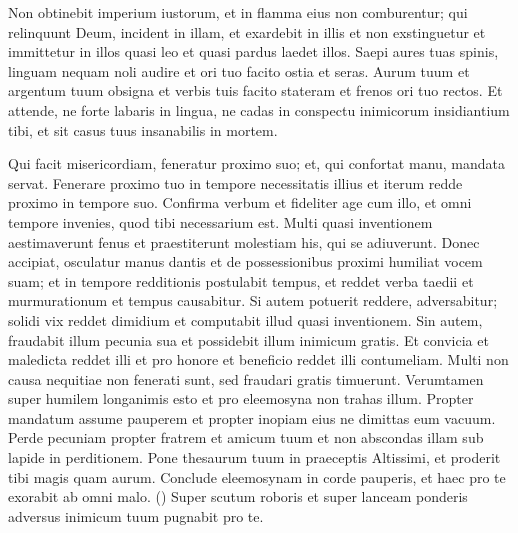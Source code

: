\begin{biblechapter}
\begin{biblechapter}
\begin{biblechapter}
\begin{biblechapter}
\begin{biblechapter}
\begin{biblechapter}
\begin{biblechapter}
\begin{biblechapter}
\begin{biblechapter}
\begin{biblechapter}
\begin{biblechapter}
\begin{biblechapter}
\begin{biblechapter}
\begin{biblechapter}
\begin{biblechapter}
\begin{biblechapter}
\begin{biblechapter}
\begin{biblechapter}
\begin{biblechapter}
\begin{biblechapter}
\begin{biblechapter}
\begin{biblechapter}
\begin{biblechapter}
\begin{biblechapter}
\begin{biblechapter}
\begin{biblechapter}
\begin{biblechapter}
\begin{biblechapter}
 \verse Non obtinebit imperium iustorum,
 et in flamma eius non comburentur;
 \verse qui relinquunt Deum, incident in illam,
 et exardebit in illis et non exstinguetur
 et immittetur in illos quasi leo
 et quasi pardus laedet illos.
 \verse Saepi aures tuas spinis, linguam nequam noli audire
 et ori tuo facito ostia et seras.
 \verse Aurum tuum et argentum tuum obsigna
 et verbis tuis facito stateram et frenos ori tuo rectos.
 \verse Et attende, ne forte labaris in lingua,
 ne cadas in conspectu inimicorum insidiantium tibi,
 et sit casus tuus insanabilis in mortem.
 
\begin{biblechapter}
 \verse Qui facit misericordiam, feneratur proximo suo;
 et, qui confortat manu, mandata servat.
 \verse Fenerare proximo tuo in tempore necessitatis illius
 et iterum redde proximo in tempore suo.
 \verse Confirma verbum et fideliter age cum illo,
 et omni tempore invenies, quod tibi necessarium est.
 \verse Multi quasi inventionem aestimaverunt fenus
 et praestiterunt molestiam his, qui se adiuverunt.
 \verse Donec accipiat, osculatur manus dantis
 et de possessionibus proximi humiliat vocem suam;
 \verse et in tempore redditionis postulabit tempus,
 et reddet verba taedii et murmurationum et tempus causabitur.
 \verse Si autem potuerit reddere, adversabitur;
 solidi vix reddet dimidium
 et computabit illud quasi inventionem.
 \verse Sin autem, fraudabit illum pecunia sua
 et possidebit illum inimicum gratis.
 \verse Et convicia et maledicta reddet illi
 et pro honore et beneficio reddet illi contumeliam.
 \verse Multi non causa nequitiae non fenerati sunt,
 sed fraudari gratis timuerunt.
 \verse Verumtamen super humilem longanimis esto
 et pro eleemosyna non trahas illum.
 \verse Propter mandatum assume pauperem
 et propter inopiam eius ne dimittas eum vacuum.
 \verse Perde pecuniam propter fratrem et amicum tuum
 et non abscondas illam sub lapide in perditionem.
 \verse Pone thesaurum tuum in praeceptis Altissimi,
 et proderit tibi magis quam aurum.
 \verse Conclude eleemosynam in corde pauperis,
 et haec pro te exorabit ab omni malo. (\verse \verse)
 \verse Super scutum roboris et super lanceam ponderis
 adversus inimicum tuum pugnabit pro te.

\end{biblechapter}
\end{biblechapter}
\end{biblechapter}
\end{biblechapter}
\end{biblechapter}
\end{biblechapter}
\end{biblechapter}
\end{biblechapter}
\end{biblechapter}
\end{biblechapter}
\end{biblechapter}
\end{biblechapter}
\end{biblechapter}
\end{biblechapter}
\end{biblechapter}
\end{biblechapter}
\end{biblechapter}
\end{biblechapter}
\end{biblechapter}
\end{biblechapter}
\end{biblechapter}
\end{biblechapter}
\end{biblechapter}
\end{biblechapter}
\end{biblechapter}
\end{biblechapter}
\end{biblechapter}
\end{biblechapter}
\end{biblechapter}
